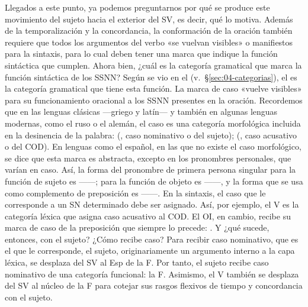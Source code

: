 \begin{recuadro}
Llegados a este punto, ya podemos preguntarnos por qué se produce este
movimiento del sujeto hacia el exterior del SV, es decir, qué lo motiva. Además
de la temporalización y la concordancia, la conformación de la oración también
requiere que todos los argumentos del verbo «se vuelvan visibles» o manifiestos
para la sintaxis, para lo cual deben tener una marca que indique la función
sintáctica que cumplen. Ahora bien, ¿cuál es la categoría gramatical que marca
la función sintáctica de los SSNN? Según se vio en el 
(v.~§\ref{sec:04-categorias}), el  es la categoría gramatical que
tiene esta función. La marca de caso «vuelve visibles» para su funcionamiento
oracional a los SSNN presentes en la oración. Recordemos que en las lenguas
clásicas ---griego y latín--- y también en algunas lenguas modernas, como el ruso
o el alemán, el caso es una categoría morfológica incluida en la desinencia de
la palabra:  (, caso nominativo o del sujeto);
 (, caso acusativo o del COD). En lenguas como el
español, en las que no existe el caso morfológico, se dice que esta marca es
abstracta, excepto en los pronombres personales, que varían en caso. Así, la
forma del pronombre de primera persona singular para la función de sujeto es
 ------; para la función de objeto
es  ------, y la
forma que se usa como complemento de preposición es  ------. En la sintaxis, el caso que le corresponde a un SN
determinado debe ser asignado. Así, por ejemplo, el V es la categoría léxica que
asigna caso acusativo al COD. El OI, en cambio, recibe su marca de caso de la
preposición  que siempre lo precede: . Y ¿qué sucede, entonces, con el sujeto? ¿Cómo recibe
caso? Para recibir caso nominativo, que es el que le corresponde, el sujeto,
originariamente un argumento interno a la capa léxica, se desplaza del SV al Esp
de la F. Por tanto, el sujeto recibe caso nominativo de una categoría funcional:
la F. Asimismo, el V también se desplaza del SV al núcleo de la F para cotejar
sus rasgos flexivos de tiempo y concordancia con el sujeto.


\end{recuadro}
